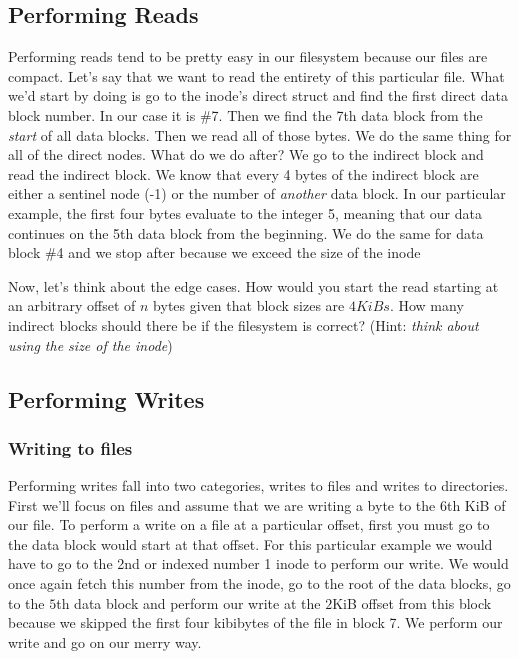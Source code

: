 \subsection{Performing Reads}

Performing reads tend to be pretty easy in our filesystem because our files are compact.
Let's say that we want to read the entirety of this particular file.
What we'd start by doing is go to the inode's direct struct and find the first direct data block number.
In our case it is \#7.
Then we find the 7th data block from the \textit{start} of all data blocks.
Then we read all of those bytes.
We do the same thing for all of the direct nodes.
What do we do after? 
We go to the indirect block and read the indirect block.
We know that every 4 bytes of the indirect block are either a sentinel node (-1) or the number of \textit{another} data block.
In our particular example, the first four bytes evaluate to the integer 5, meaning that our data continues on the 5th data block from the beginning.
We do the same for data block \#4 and we stop after because we exceed the size of the inode

Now, let's think about the edge cases.
How would you start the read starting at an arbitrary offset of $n$ bytes given that block sizes are $4 KiBs$.
How many indirect blocks should there be if the filesystem is correct? (Hint: \textit{think about using the size of the inode})

\subsection{Performing Writes}
\subsubsection{Writing to files}
Performing writes fall into two categories, writes to files and writes to directories.
First we'll focus on files and assume that we are writing a byte to the $6$th KiB of our file.
To perform a write on a file at a particular offset, first you must go to the data block would start at that offset.
For this particular example we would have to go to the 2nd or indexed number 1 inode to perform our write.
We would once again fetch this number from the inode, go to the root of the data blocks, go to the $5$th data block and perform our write at the $2$KiB offset from this block because we skipped the first four kibibytes of the file in block 7.
We perform our write and go on our merry way.


